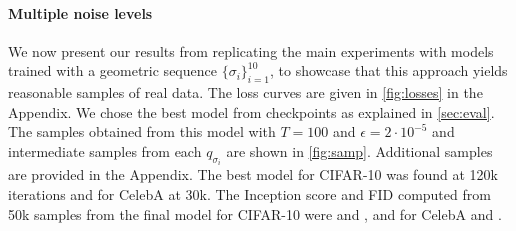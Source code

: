 \paragraph{Multiple noise levels} We now present our results from replicating the main experiments with models trained with a geometric sequence $\{\sigma_i\}_{i=1}^{10}$, to showcase that this approach yields reasonable samples of real data. The loss curves are given in \autoref{fig:losses} in the Appendix. We chose the best model from checkpoints as explained in \autoref{sec:eval}. The samples obtained from this model with $T=100$ and $\epsilon=2 \cdot 10^{-5}$ and intermediate samples from each $q_{\sigma_i}$ are shown in \autoref{fig:samp}. Additional samples are provided in the Appendix. The best model for CIFAR-10 was found at 120k iterations and for CelebA at 30k. The Inception score and FID computed from 50k samples from the final model for CIFAR-10 were  and , and for CelebA  and .

